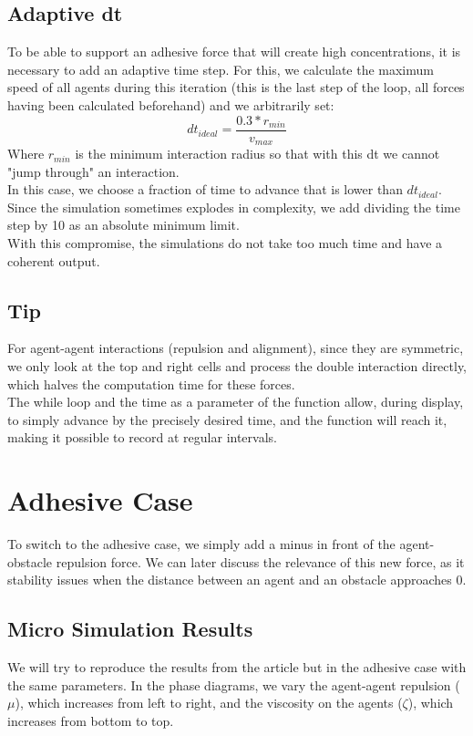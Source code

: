 \documentclass{article}
\begin{document}
\subsection{Adaptive dt}
To be able to support an adhesive force that will create high concentrations, it is necessary to add an adaptive time step.
For this, we calculate the maximum speed of all agents during this iteration (this is the last step of the loop, all forces having been calculated beforehand) and we arbitrarily set:
$$dt_{ideal} = \frac{0.3 * r_{min}}{v_{max}}$$
Where $r_{min}$ is the minimum interaction radius so that with this dt we cannot "jump through" an interaction.\\
In this case, we choose a fraction of time to advance that is lower than $dt_{ideal}$.\\
Since the simulation sometimes explodes in complexity, we add dividing the time step by 10 as an absolute minimum limit.\\
With this compromise, the simulations do not take too much time and have a coherent output.

\subsection{Tip}
For agent-agent interactions (repulsion and alignment), since they are symmetric, we only look at the top and right cells and process the double interaction directly, which halves the computation time for these forces.\\
The while loop and the time as a parameter of the function allow, during display, to simply advance by the precisely desired time, and the function will reach it, making it possible to record at regular intervals.

\section{Adhesive Case}
To switch to the adhesive case, we simply add a minus in front of the agent-obstacle repulsion force. We can later discuss the relevance of this new force, as it stability issues when the distance between an agent and an obstacle approaches 0.

\subsection{Micro Simulation Results}
We will try to reproduce the results from the article but in the adhesive case with the same parameters. In the phase diagrams, we vary the agent-agent repulsion ($\mu$), which increases from left to right, and the viscosity on the agents ($\zeta$), which increases from bottom to top.
\end{document}
